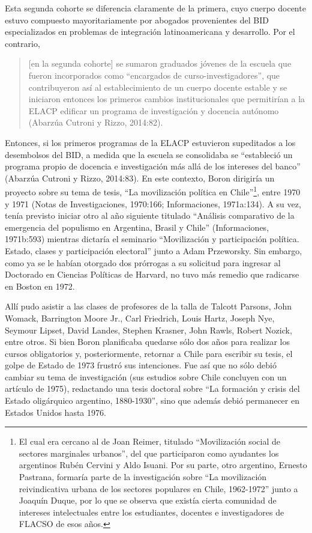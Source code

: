 Esta segunda cohorte se diferencia claramente de la primera, cuyo cuerpo docente estuvo compuesto mayoritariamente por abogados provenientes del BID especializados en problemas de integración latinoamericana y desarrollo. Por el contrario,

\begin{quote}
{[}en la segunda cohorte{]} se sumaron graduados jóvenes de la escuela que fueron incorporados como ``encargados de curso-investigadores'', que contribuyeron así al establecimiento de un cuerpo docente estable y se iniciaron entonces los primeros cambios institucionales que permitirían a la ELACP edificar un programa de investigación y docencia autónomo (Abarzúa Cutroni y Rizzo, 2014:82).
\end{quote}

Entonces, si los primeros programas de la ELACP estuvieron supeditados a los desembolsos del BID, a medida que la escuela se consolidaba se ``estableció un programa propio de docencia e investigación más allá de los intereses del banco'' (Abarzúa Cutroni y Rizzo, 2014:83). En este contexto, Boron dirigiría un proyecto sobre su tema de tesis, ``La movilización política en Chile''\footnote{El cual era cercano al de Joan Reimer, titulado ``Movilización social de sectores marginales urbanos'', del que participaron como ayudantes los argentinos Rubén Cervini y Aldo Isuani. Por su parte, otro argentino, Ernesto Pastrana, formaría parte de la investigación sobre ``La movilización reivindicativa urbana de los sectores populares en Chile, 1962-1972'' junto a Joaquín Duque, por lo que se observa que existía cierta comunidad de intereses intelectuales entre los estudiantes, docentes e investigadores de FLACSO de esos años.}, entre 1970 y 1971 (Notas de Investigaciones, 1970:166; Informaciones, 1971a:134). A su vez, tenía previsto iniciar otro al año siguiente titulado ``Análisis comparativo de la emergencia del populismo en Argentina, Brasil y Chile'' (Informaciones, 1971b:593) mientras dictaría el seminario ``Movilización y participación política. Estado, clases y participación electoral'' junto a Adam Przeworsky. Sin embargo, como ya se le habían otorgado dos prórrogas a su solicitud para ingresar al Doctorado en Ciencias Políticas de Harvard, no tuvo más remedio que radicarse en Boston en 1972.

Allí pudo asistir a las clases de profesores de la talla de Talcott Parsons, John Womack, Barrington Moore Jr., Carl Friedrich, Louis Hartz, Joseph Nye, Seymour Lipset, David Landes, Stephen Krasner, John Rawls, Robert Nozick, entre otros. Si bien Boron planificaba quedarse sólo dos años para realizar los cursos obligatorios y, posteriormente, retornar a Chile para escribir su tesis, el golpe de Estado de 1973 frustró sus intenciones. Fue así que no sólo debió cambiar su tema de investigación (sus estudios sobre Chile concluyen con un artículo de 1975), redactando una tesis doctoral sobre ``La formación y crisis del Estado oligárquico argentino, 1880-1930'', sino que además debió permanecer en Estados Unidos hasta 1976.

